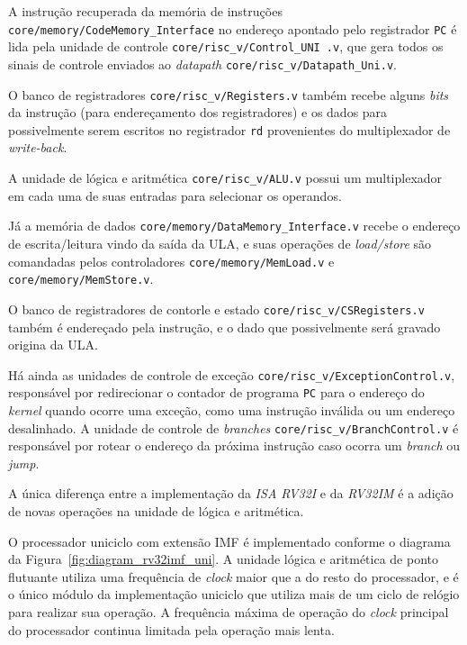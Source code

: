         { A instrução recuperada da memória de instruções \texttt{core/memory/CodeMemory\_Interface}
            no endereço apontado pelo registrador \texttt{PC} é lida pela unidade de controle
            \texttt{core/risc\_v/Control\_UNI .v}, que gera todos os sinais de
            controle enviados ao \textit{datapath} \texttt{core/risc\_v/Datapath\_Uni.v}.
        }

        {
            O banco de registradores \texttt{core/risc\_v/Registers.v} também
            recebe alguns \textit{bits} da instrução (para endereçamento dos
            registradores) e os dados para possivelmente serem escritos no registrador
            \texttt{rd} provenientes do multiplexador de \textit{write-back}.
        }

        { A unidade de lógica e aritmética \texttt{core/risc\_v/ALU.v} possui um
            multiplexador em cada uma de suas entradas para selecionar os operandos.
        }

        {
            Já a memória de dados \texttt{core/memory/DataMemory\_Interface.v}
            recebe o endereço de escrita/leitura vindo da saída da ULA, e suas
            operações de \textit{load/store} são comandadas pelos controladores
            \texttt{core/memory/MemLoad.v} e \texttt{core/memory/MemStore.v}.
        }

        { O banco de registradores de contorle e estado \texttt{core/risc\_v/CSRegisters.v}
            também é endereçado pela instrução, e o dado que possivelmente será
            gravado origina da ULA.
        }

        { Há ainda as unidades de controle de exceção \texttt{core/risc\_v/ExceptionControl.v},
            responsável por redirecionar o contador de programa \texttt{PC} para
            o endereço do \textit{kernel} quando ocorre uma exceção, como uma
            instrução inválida ou um endereço desalinhado. A unidade de controle
            de \textit{branches} \texttt{core/risc\_v/BranchControl.v} é responsável
            por rotear o endereço da próxima instrução caso ocorra um \textit{branch}
            ou \textit{jump}.
        }

        { A única diferença entre a implementação da \textit{ISA RV32I} e da
            \textit{RV32IM} é a adição de novas operações na unidade de lógica e
            aritmética.
        }

        { O processador uniciclo com extensão IMF é implementado conforme o
            diagrama da Figura~\ref{fig:diagram_rv32imf_uni}. A unidade lógica e
            aritmética de ponto flutuante utiliza uma frequência de \textit{clock}
            maior que a do resto do processador, e é o único módulo da implementação
            uniciclo que utiliza mais de um ciclo de relógio para realizar sua
            operação. A frequência máxima de operação do \textit{clock} principal
            do processador continua limitada pela operação mais lenta.
        }

